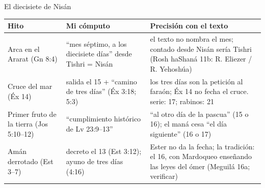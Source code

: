 \begin{frame}{El diecisiete de Nisán}
\scriptsize\renewcommand{\arraystretch}{1.1}
\begin{tabular}{@{}L{2.5cm}L{3.6cm}L{5.8cm}@{}}
\toprule
\textbf{Hito} & \textbf{Mi cómputo} & \textbf{Precisión con el texto} \\ \midrule
Arca en el Ararat (Gn 8:4) & ``mes séptimo, a los diecisiete días'' desde Tishri = Nisán & el texto no nombra el mes; contado desde Nisán sería Tishri (Rosh haShaná 11b: R. Eliezer / R. Yehoshúa) \\
Cruce del mar (Éx 14) & salida el 15 + ``camino de tres días'' (Éx 3:18; 5:3) & los tres días son la petición al faraón; Éx 14 no fecha el cruce. serie: 17; rabinos: 21 \\
Primer fruto de la tierra (Jos 5:10--12) & ``cumplimiento histórico de Lv 23:9--13'' & ``al otro día de la pascua'' (15 o 16); el maná cesa ``el día siguiente'' (16 o 17) \\
Amán derrotado (Est 3--7) & decreto el 13 (Est 3:12); ayuno de tres días (4:16) & Ester no da la fecha; la tradición: el 16, con Mardoqueo enseñando las leyes del ómer (Meguilá 16a; verificar) \\
\bottomrule
\end{tabular}\par\medskip
{}
\end{frame}

